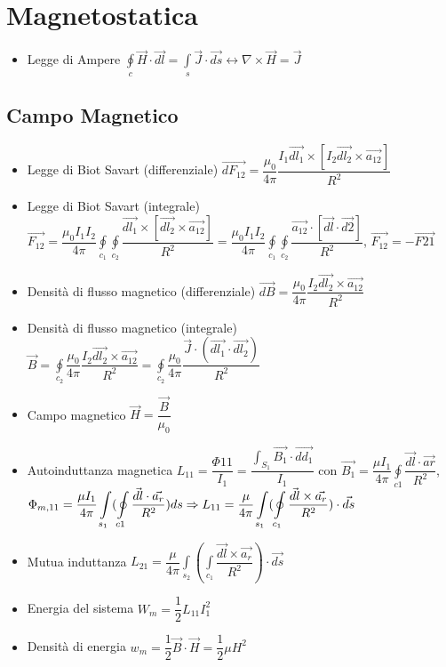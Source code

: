 \documentclass{article}
\begin{document}
\section{Magnetostatica}
\begin{itemize}
	\item Legge di Ampere \( \displaystyle \oint\limits_{c} \vec{H} \cdot \vec{dl} = \int\limits_{s} \vec{J} \cdot \vec{ds} \leftrightarrow \nabla \times \vec{H} = \vec{J} \)
\end{itemize}

\subsection{Campo Magnetico}
\begin{itemize}
	\item Legge di Biot Savart (differenziale) \( \vec{dF_{12}} = \dfrac{\mu_0}{4 \pi} \dfrac{I_1 \vec{dl_1} \times [I_2 \vec{dl_2} \times \vec{a_{12}}] }{R^2} \)
	\item Legge di Biot Savart (integrale) \( \vec{F_{12}} = \dfrac{\mu_0 I_1 I_2}{4 \pi} \oint\limits_{c_1} \oint\limits_{c_2} \dfrac{\vec{dl_1} \times [\vec{dl_2} \times \vec{a_{12}}]} {R^2} = \dfrac{\mu_0 I_1 I_2}{4 \pi} \oint\limits_{c_1} \oint\limits_{c_2} \dfrac{\vec{a_{12}} \cdot [\vec{dl} \cdot \vec{d2}]} {R^2} \), \(\vec{F_{12}} = - \vec{F{21}} \)
	\item Densità di flusso magnetico (differenziale) \( \vec{dB} = \dfrac{\mu_0}{4 \pi} \dfrac{I_2 \vec{dl_2} \times \vec{a_{12}}}{R^2} \)
	\item Densità di flusso magnetico (integrale) \( \vec{B} = \oint\limits_{c_2} \dfrac{\mu_0}{4 \pi} \dfrac{I_2 \vec{dl_2} \times \vec{a_{12}}}{R^2} = \oint\limits_{c_2} \dfrac{\mu_0}{4 \pi} \dfrac{\vec{J} \cdot ( \vec{dl_{1}} \cdot \vec{dl_2} )}{R^2}\)
	\item Campo magnetico \( \vec{H} = \dfrac{\vec{B}}{\mu_0} \)
	\item Autoinduttanza magnetica \(\displaystyle L_{11} = \dfrac{\Phi{11}}{I_1} = \dfrac{\int_{S_1} \vec{B_1} \cdot \vec{dd_1}}{I_1} \) con \( \vec{B_1} = \dfrac{\mu I_1}{4 \pi} \oint\limits_{c1} \dfrac{\vec{dl} \cdot \vec{ar}}{R^2} \), \(\displaystyle \Phi_{m, 11} = \dfrac{\mu I_1}{4 \pi} \int\limits_{s_1} ( \oint\limits_{c1} \dfrac{\vec{dl} \cdot \vec{a_r}}{R^2}) ds \linebreak \Rightarrow L_{11} = \dfrac{\mu}{4 \pi} \int\limits_{s_1} ( \oint\limits_{c_1} \dfrac{\vec{dl} \times \vec{a_r}}{R^2}) \cdot \vec{ds}\)
	\item Mutua induttanza \(\displaystyle L_{21} = \dfrac{\mu}{4 \pi} \int\limits_{s_2} ( \int\limits_{c_1} \dfrac{\vec{dl} \times \vec{a_r}}{R^2} ) \cdot \vec{ds} \)
	\item Energia del sistema \( W_m = \dfrac{1}{2} L_{11} I_1^2 \)
	\item Densità di energia  \( w_m = \dfrac{1}{2} \vec{B} \cdot \vec{H} = \dfrac{1}{2} \mu H^2 \)
\end{itemize}
\end{document}
